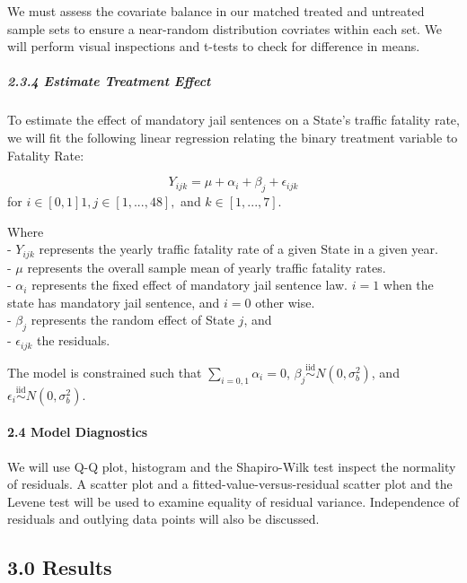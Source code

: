 \documentclass[]{article}
\let\oldparagraph\paragraph
\renewcommand{\paragraph}[1]{\oldparagraph{#1}\mbox{}}
\let\oldsubparagraph\subparagraph
\renewcommand{\subparagraph}[1]{\oldsubparagraph{#1}\mbox{}}
\begin{document}
We must assess the covariate balance in our matched treated and untreated sample sets to ensure a near-random distribution covriates within each set. We will perform visual inspections and t-tests to check for difference in means.

\hypertarget{estimate-treatment-effect}{%
\subparagraph{2.3.4 Estimate Treatment Effect}\label{estimate-treatment-effect}}

To estimate the effect of mandatory jail sentences on a State's traffic fatality rate, we will fit the following linear regression relating the binary treatment variable to Fatality Rate:

\[
Y_{ijk} = \mu + \alpha_i + \beta_j + \epsilon_{ijk}
\]
for \(i \in [0, 1] 1, j \in [1, ..., 48],\) and \(k \in [1, ..., 7]\).

Where\\
- \(Y_{ijk}\) represents the yearly traffic fatality rate of a given State in a given year.\\
- \(\mu\) represents the overall sample mean of yearly traffic fatality rates.\\
- \(\alpha_i\) represents the fixed effect of mandatory jail sentence law. \(i = 1\) when the state has mandatory jail sentence, and \(i = 0\) other wise.\\
- \(\beta_j\) represents the random effect of State \(j\), and\\
- \(\epsilon_{ijk}\) the residuals.

The model is constrained such that \(\displaystyle\sum\limits_{i = 0, 1}\alpha_i = 0\), \(\beta_j \overset{\text{iid}}\sim N(0, \sigma^2_b)\), and \(\epsilon_i \overset{\text{iid}}\sim N(0, \sigma^2_b)\).

\hypertarget{model-diagnostics}{%
\paragraph{2.4 Model Diagnostics}\label{model-diagnostics}}

We will use Q-Q plot, histogram and the Shapiro-Wilk test inspect the normality of residuals. A scatter plot and a fitted-value-versus-residual scatter plot and the Levene test will be used to examine equality of residual variance. Independence of residuals and outlying data points will also be discussed.

\hypertarget{results}{%
\subsection{3.0 Results}\label{results}}
\end{document}
